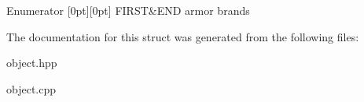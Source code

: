 \begin{DoxyEnumFields}{Enumerator}
[0pt][0pt]{}\mbox{\label{structmods_1_1object_a6a8f895bbe1d2306a097a2090a6caf7fa7ccaec47a076f7b853883551349def93}} 
F\+I\+R\+ST&E\+ND armor brands \\
\hline

\end{DoxyEnumFields}


The documentation for this struct was generated from the following files\+:\begin{DoxyCompactItemize}
\item 
object.\+hpp\item 
object.\+cpp\end{DoxyCompactItemize}
